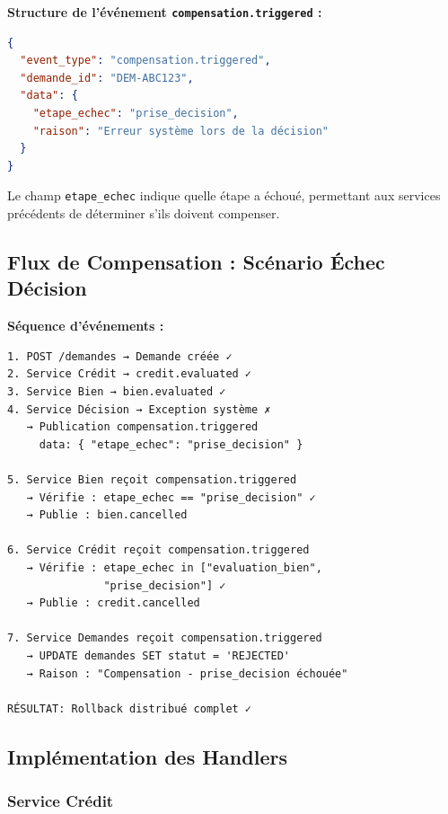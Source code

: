\documentclass[12pt,a4paper]{article}
\begin{document}
\textbf{Structure de l'événement \texttt{compensation.triggered} :}

\begin{lstlisting}[language=json]
{
  "event_type": "compensation.triggered",
  "demande_id": "DEM-ABC123",
  "data": {
    "etape_echec": "prise_decision",
    "raison": "Erreur système lors de la décision"
  }
}
\end{lstlisting}

Le champ \texttt{etape\_echec} indique quelle étape a échoué, permettant aux services précédents de déterminer s'ils doivent compenser.

\subsection{Flux de Compensation : Scénario Échec Décision}

\textbf{Séquence d'événements :}

\begin{verbatim}
1. POST /demandes → Demande créée ✓
2. Service Crédit → credit.evaluated ✓
3. Service Bien → bien.evaluated ✓
4. Service Décision → Exception système ✗
   → Publication compensation.triggered
     data: { "etape_echec": "prise_decision" }

5. Service Bien reçoit compensation.triggered
   → Vérifie : etape_echec == "prise_decision" ✓
   → Publie : bien.cancelled

6. Service Crédit reçoit compensation.triggered
   → Vérifie : etape_echec in ["evaluation_bien", 
               "prise_decision"] ✓
   → Publie : credit.cancelled

7. Service Demandes reçoit compensation.triggered
   → UPDATE demandes SET statut = 'REJECTED'
   → Raison : "Compensation - prise_decision échouée"

RÉSULTAT: Rollback distribué complet ✓
\end{verbatim}

\subsection{Implémentation des Handlers}

\subsubsection{Service Crédit}
\end{document}

